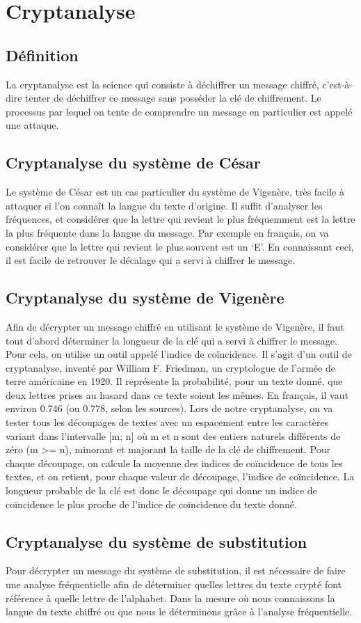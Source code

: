 \chapter{Cryptanalyse}
	\section{Définition}
		La cryptanalyse est la science qui consiste à déchiffrer un message chiffré, c’est-à-dire tenter de déchiffrer ce message sans posséder la clé de chiffrement. Le processus par lequel on tente de comprendre un message en particulier est appelé une attaque.
	\section{Cryptanalyse du système de César}
		Le système de César est un cas particulier du système de Vigenère, très facile à attaquer si l’on connaît la langue du texte d’origine. Il suffit d’analyser les fréquences, et considérer que la lettre qui revient le plus fréquemment est la lettre la plus fréquente dans la langue du message. Par exemple en français, on va considérer que la lettre qui revient le plus souvent est un ‘E’. En connaissant ceci, il est facile de retrouver le décalage qui a servi à chiffrer le message.
	\section{Cryptanalyse du système de Vigenère}
		Afin de décrypter un message chiffré en utilisant le système de Vigenère, il faut tout d’abord déterminer la longueur de la clé qui a servi à chiffrer le message. Pour cela, on utilise un outil appelé l’indice de coïncidence.
		Il s’agit d’un outil de cryptanalyse, inventé par William F. Friedman, un cryptologue de l’armée de terre américaine en 1920. Il représente la probabilité, pour un texte donné, que deux lettres prises au hasard dans ce texte soient les mêmes.
		En français, il vaut environ 0.746 (ou 0.778, selon les sources).
		Lors de notre cryptanalyse, on va tester tous les découpages de textes avec un espacement entre les caractères variant dans l’intervalle [m; n] où m et n sont des entiers naturels différents de zéro (m >= n), minorant et majorant la taille de la clé de chiffrement. Pour chaque découpage, on calcule la moyenne des indices de coïncidence de tous les textes, et on retient, pour chaque valeur de découpage, l’indice de coïncidence. La longueur probable de la clé est donc le découpage qui donne un indice de coïncidence le plus proche de l’indice de coïncidence du texte donné.
	\section{Cryptanalyse du système de substitution}
		Pour décrypter un message du système de substitution, il est 
		nécessaire de faire une analyse fréquentielle afin de déterminer
		quelles lettres du texte crypté font référence à quelle lettre de l'alphabet. Dans la mesure où nous connaissons la langue du texte chiffré ou que nous le déterminons grâce à l'analyse fréquentielle.  
		